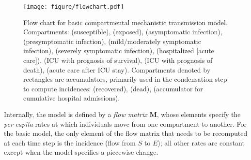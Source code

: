 \documentclass[12pt]{article}\usepackage[]{graphicx}\usepackage[]{color}
\begin{document}
\begin{figure}
\color{fgcolor}
\texttt{[image: figure/flowchart.pdf]}
\caption{Flow chart for basic compartmental mechanistic transmission
  model. Compartments:  (susceptible),  (exposed),
   (asymptomatic infection),  (presymptomatic
  infection),  (mild/moderately symptomatic infection),
   (severely symptomatic infection),  (hospitalized
  [acute care]),  (ICU with prognosis of survival),
   (ICU with prognosis of death),  (acute care
  after ICU stay). Compartments denoted by rectangles are
  accumulators, primarily used in the condensation step to compute
  incidences:  (recovered),  (dead), 
  (accumulator for cumulative hospital admissions).
  }
\label{fig:flowchart}
\end{figure}



Internally, the model is defined by a \emph{flow matrix} $\mathbf{M}$, whose elements specify
the \emph{per capita} rates at which individuals move from one compartment to another.
For the basic model, the only element of the flow matrix that needs to be recomputed
at each time step is the incidence (flow from $S$ to $E$); all other rates are constant
except when the model specifies a piecewise change.
\end{document}
